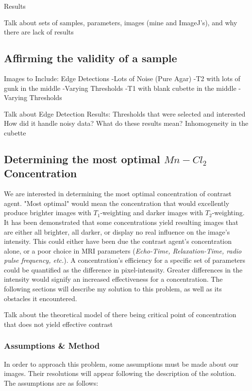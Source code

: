 \documentclass[a4paper,12pt]{article}
\begin{document}
\newpage
\begin{section}{Results}

Talk about sets of samples, parameters, images (mine and ImageJ's), and why there are lack of results

\subsection{Affirming the validity of a sample}
Images to Include: Edge Detections
	-Lots of Noise (Pure Agar)
	-T2 with lots of gunk in the middle
		-Varying Thresholds
	-T1 with blank cubette in the middle
		-Varying Thresholds

Talk about Edge Detection Results:
	Thresholds that were selected and interested
	How did it handle noisy data?
	What do these results mean?
	Inhomogeneity in the cubette

\subsection{Determining the most optimal $Mn-Cl_2$ Concentration}

We are interested in determining the most optimal concentration of contrast agent. "Most optimal" would mean the concentration that would excellently produce brighter images with $T_1$-weighting and darker images with $T_2$-weighting. It has been demonstrated that some concentrations yield resulting images that are either all brighter, all darker, or display no real influence on the image's intensity. This could either have been due the contrast agent's concentration alone, or a poor choice in MRI parameters ({\em Echo-Time, Relaxation-Time, radio pulse frequency, etc.}). A concentration's efficiency for a specific set of parameters could be quantified as the difference in pixel-intensity. Greater differences in the intensity would signify an increased effectiveness for a concentration. The following sections will describe my solution to this problem, as well as its obstacles it encountered.

Talk about the theoretical model of there being critical point of concentration that does not yield effective contrast

\subsubsection{Assumptions \& Method}

In order to approach this problem, some assumptions must be made about our images. Their resolutions will appear following the description of the solution. The assumptions are as follows:


\end{section}
\end{document}
